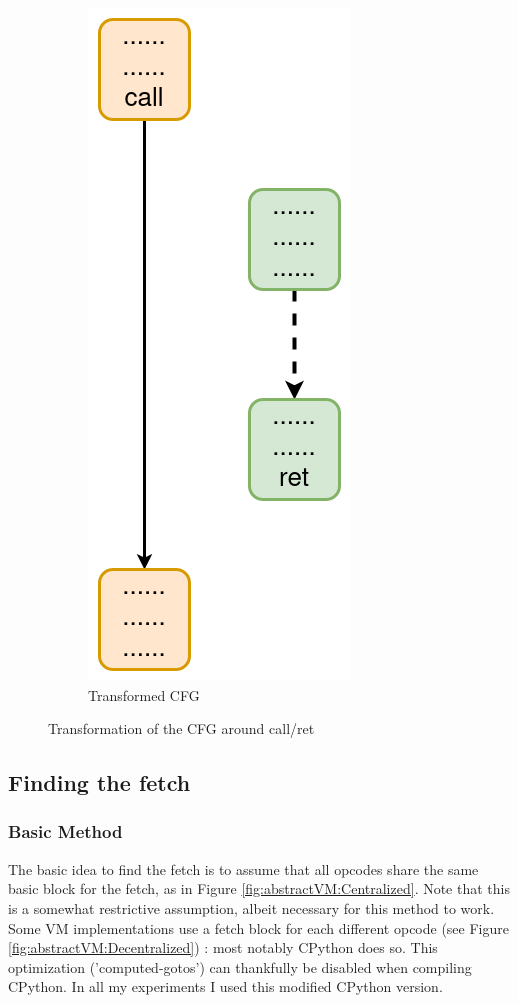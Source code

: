 \documentclass[french]{article}
\begin{document}
\begin{figure}[htp]
\begin{subfigure}{.5\textwidth}
		\includegraphics[width=.4\linewidth]{img/CallRetAfter.png}
		\caption{Transformed CFG}
	\end{subfigure}
	
	\caption{Transformation of the CFG around call/ret}
	\label{fig:callRet}
\end{figure}
 
\subsection{Finding the fetch}

\subsubsection{Basic Method}

The basic idea to find the fetch is to assume that all opcodes share the same basic block for the fetch, as in Figure \ref{fig:abstractVM:Centralized}.
Note that this is a somewhat restrictive assumption, albeit necessary for this method to work. Some VM implementations use a fetch block for each different opcode (see Figure \ref{fig:abstractVM:Decentralized}) : most notably CPython does so. This optimization ('computed-gotos') can thankfully be disabled when compiling CPython. In all my experiments I used this modified CPython version.
\end{document}
